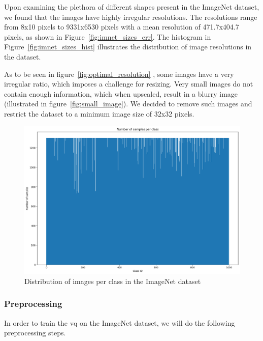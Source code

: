 Upon examining the plethora of different shapes present in the ImageNet dataset, we found that the images have highly
irregular resolutions.
The resolutions range from 8x10 pixels to 9331x6530 pixels with a mean resolution of 471.7x404.7 pixels, as shown in
Figure~\ref{fig:imnet_sizes_err}.
The histogram in Figure~\ref{fig:imnet_sizes_hist} illustrates the distribution of image resolutions in the dataset.

As to be seen in figure~\ref{fig:optimal_resolution}
, some images have a very irregular ratio, which imposes a challenge for resizing.
Very small images do not contain enough information, which when upscaled, result in a blurry image (illustrated in
figure~\ref{fig:small_image}).
We decided to remove such images and restrict the dataset to a minimum image size of 32x32 pixels.

\begin{figure}
    \centering
    \includegraphics[width=\textwidth]{../../sample_images/imagenet_dist}
    \caption{Distribution of images per class in the ImageNet dataset}
    \label{fig:imnet_dist}
\end{figure}

\subsubsection{Preprocessing}
In order to train the \ac{vq} on the ImageNet dataset, we will do the following preprocessing steps.

